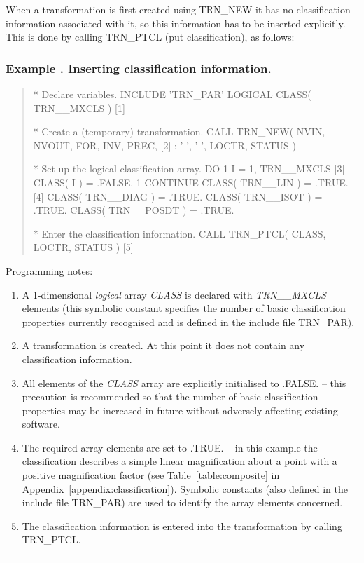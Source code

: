 \documentclass[twoside,nolof,11pt]{starlink}
\providecommand{\name}[1]{\small{#1}}
\providecommand{\fortvar}[1]{\emph{#1}}
\newcounter{examplecounter}
\providecommand{\example}[1]{\addtocounter{examplecounter}{1}
                         \subsubsection*{Example \theexamplecounter. #1}}
\providecommand{\exampledone}[0]{\begin{center} \rule{6em}{0.2mm} \end{center}}
\begin{document}
When a transformation is first created using \name{TRN\_NEW} it has no
classification information associated with it, so this information has to be
inserted explicitly.
This is done by calling \name{TRN\_PTCL} (put classification), as follows:

\example{Inserting classification information.}

\begin{quote}
\begin{terminalv}

*  Declare variables.
      INCLUDE 'TRN_PAR'
      LOGICAL CLASS( TRN__MXCLS )                      [1]

*  Create a (temporary) transformation.
      CALL TRN_NEW( NVIN, NVOUT, FOR, INV, PREC,       [2]
     :              ' ', ' ', LOCTR, STATUS )

*  Set up the logical classification array.
      DO 1 I = 1, TRN__MXCLS                           [3]
         CLASS( I ) = .FALSE.
    1 CONTINUE
      CLASS( TRN__LIN ) = .TRUE.                       [4]
      CLASS( TRN__DIAG ) = .TRUE.
      CLASS( TRN__ISOT ) = .TRUE.
      CLASS( TRN__POSDT ) = .TRUE.

*  Enter the classification information.
      CALL TRN_PTCL( CLASS, LOCTR, STATUS )            [5]

\end{terminalv}
\end{quote}

Programming notes:

\begin{enumerate}

\item A 1-dimensional \emph{logical} array \fortvar{CLASS} is declared with
\fortvar{TRN\_\_MXCLS} elements (this symbolic constant specifies the number
of basic classification properties currently recognised and is defined in
the include file \name{TRN\_PAR}).

\item A transformation is created.
At this point it does not contain any classification information.

\item All elements of the \fortvar{CLASS} array are explicitly initialised
to \name{.FALSE.} -- this precaution is recommended so that the number of
basic classification properties may be increased in future without adversely
affecting existing software.

\item The required array elements are set to \name{.TRUE.} -- in this
example the classification describes a simple linear magnification about a
point with a positive magnification factor (see Table~\ref{table:composite}
in Appendix~\ref{appendix:classification}).
Symbolic constants (also defined in the include file \name{TRN\_PAR}) are
used to identify the array elements concerned.

\item The classification information is entered into the transformation by
calling \name{TRN\_PTCL}.

\end{enumerate}
\exampledone
\end{document}
